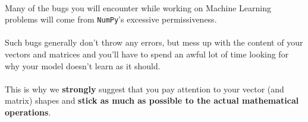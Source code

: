 \\
Many of the bugs you will encounter while working on Machine Learning 
problems will come from \texttt{NumPy}'s excessive permissiveness.\\
\\
Such bugs generally don't throw any errors, but mess up with the content of your
 vectors and matrices and you'll have to spend an awful lot of time looking for why 
 your model doesn't learn as it should.\\
\\
This is why we \textbf{strongly} suggest that you pay attention to your 
vector (and matrix) shapes and \textbf{stick as much as 
possible to the actual mathematical operations}.\\
\\
